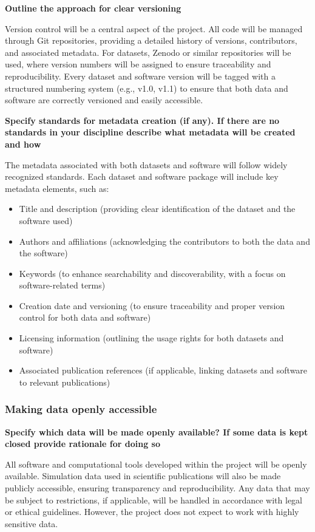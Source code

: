 \documentclass[a4paper,12pt]{article}
\begin{document}
\noindent \textbf{Outline the approach for clear versioning}

Version control will be a central aspect of the project. All code will be managed through Git repositories, providing a detailed history of versions, contributors, and associated metadata. For datasets, Zenodo or similar repositories will be used, where version numbers will be assigned to ensure traceability and reproducibility. Every dataset and software version will be tagged with a structured numbering system (e.g., v1.0, v1.1) to ensure that both data and software are correctly versioned and easily accessible.

\noindent \textbf{Specify standards for metadata creation (if any). If there are no standards in your discipline describe what metadata will be created and how}

The metadata associated with both datasets and software will follow widely recognized standards. Each dataset and software package will include key metadata elements, such as:

\begin{itemize}
    \item Title and description (providing clear identification of the dataset and the software used) 
    \item Authors and affiliations (acknowledging the contributors to both the data and the software) 
    \item Keywords (to enhance searchability and discoverability, with a focus on software-related terms) 
    \item Creation date and versioning (to ensure traceability and proper version control for both data and software) 
    \item Licensing information (outlining the usage rights for both datasets and software)
    \item Associated publication references (if applicable, linking datasets and software to relevant publications) 
\end{itemize}


\subsubsection{Making data openly accessible}

\noindent \textbf{Specify which data will be made openly available? If some data is kept closed provide rationale for doing so}

All software and computational tools developed within the project will be openly available. Simulation data used in scientific publications will also be made publicly accessible, ensuring transparency and reproducibility. Any data that may be subject to restrictions, if applicable, will be handled in accordance with legal or ethical guidelines. However, the project does not expect to work with highly sensitive data.
\end{document}

